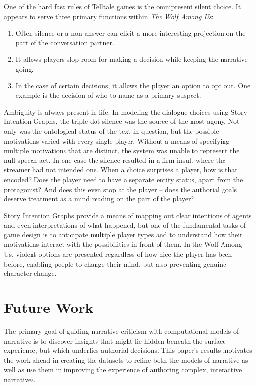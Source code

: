 One of the hard fast rules of Telltale games is the omnipresent silent
choice. It appears to serve three primary functions within \emph{The Wolf
Among Us}:

\begin{enumerate}
\item Often silence or a non-answer can elicit a more interesting
projection on the part of the conversation partner.
\item It allows players slop room for making a decision while keeping the
narrative going.
\item In the case of certain decisions, it allows the player an option to
opt out. One example is the decision of who to name as a primary
suspect.
\end{enumerate}

Ambiguity is always present in life. In modeling the dialogue choices
using Story Intention Graphs, the triple dot silence was the source of
the most agony. Not only was the ontological status of the text in
question, but the possible motivations varied with every single
player. Without a means of specifying multiple motivations that are
distinct, the system was unable to represent the null speech act. In
one case the silence resulted in a firm insult where the streamer had
not intended one. When a choice surprises a player, how is that
encoded? Does the player need to have a separate entity status, apart
from the protagonist? And does this even stop at the player -- does
the authorial goals deserve treatment as a mind reading on the part of
the player?

Story Intention Graphs provide a means of mapping out clear intentions
of agents and even interpretations of what happened, but one of the
fundamental tasks of game design is to anticipate multiple player
types and to understand how their motivations interact with the
possibilities in front of them. In the Wolf Among Us, violent options
are presented regardless of how nice the player has been before,
enabling people to change their mind, but also preventing genuine
character change.

\section{Future Work}
\label{sec:orgheadline14}
The primary goal of guiding narrative criticism with computational
models of narrative is to discover insights that might lie hidden
beneath the surface experience, but which underlies authorial
decisions. This paper's results motivates the work ahead in creating
the datasets to refine both the models of narrative as well as use
them in improving the experience of authoring complex, interactive
narratives.

